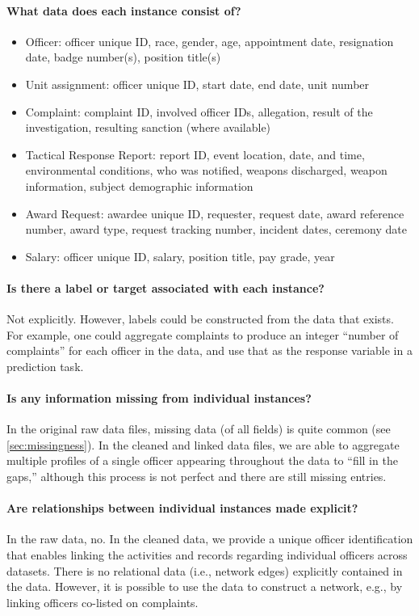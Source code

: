 \paragraph{What data does each instance consist of?}
\begin{itemize}
\item Officer: officer unique ID, race, gender, age, appointment date, resignation date, badge number(s), position title(s)
\item Unit assignment: officer unique ID, start date, end date, unit number
\item Complaint: complaint ID, involved officer IDs, allegation, result of the investigation, resulting sanction (where available)
\item Tactical Response Report: report ID, event location, date, and time, environmental conditions, who was notified, weapons discharged, weapon information, subject demographic information 
\item Award Request: awardee unique ID, requester, request date, award reference number, award type, request tracking number, incident dates, ceremony date
\item Salary: officer unique ID, salary, position title, pay grade, year
\end{itemize}

\paragraph{Is there a label or target associated with each instance?}
Not explicitly. However, labels could be constructed from the data 
that exists. For example, one could aggregate complaints to produce
an integer ``number of complaints'' for each officer in the data,
and use that as the response variable in a prediction task.

\paragraph{Is any information missing from individual instances?}
In the original raw data files, missing data (of all fields) is quite common
(see \cref{sec:missingness}).  In the cleaned and linked data files, we are
able to aggregate multiple profiles of a single officer appearing throughout
the data to ``fill in the gaps,'' although this process is not perfect and
there are still missing entries.

\paragraph{Are relationships between individual instances made explicit?}
In the raw data, no. In the cleaned data, we provide a unique officer
identification that enables linking the activities and records regarding
individual officers across datasets. There is no relational data (i.e., network edges)
explicitly contained in the data. However, it is possible to use the data
to construct a network, e.g., by linking officers co-listed on complaints.

